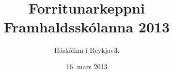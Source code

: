 \documentclass[11pt,a4paper,oneside]{article}
\title{Forritunarkeppni Framhaldsskólanna 2013}
\date{16. mars 2013}
\author{Háskólinn í Reykjavík}
\newcommand{\problemstatement}[1]{  }
\begin{document}
	\maketitle
	\thispagestyle{empty}
	\pagebreak
	\problemstatement{hallo_heimur}
	\problemstatement{namundun}
	\problemstatement{nidurteljari}
	\problemstatement{jolagjafir}
	\problemstatement{fjoldi_stafa}
	\problemstatement{tveirstrengir}
	\problemstatement{happy_birthday}
	\problemstatement{deiling}
	\problemstatement{deiling_while}
	\problemstatement{compression}
	\problemstatement{decompression}
	\problemstatement{gotumalning}
	\problemstatement{freq_analysis}
	\problemstatement{fullkomintala}
	\problemstatement{ex}
	\problemstatement{stigatafla}
	\problemstatement{logleg_nofn}
	\problemstatement{stysta_leid_skak}

	\problemstatement{veldi_af_2}
	\problemstatement{ofugur_texti}
	\problemstatement{kula_i_kassa}
	\problemstatement{lykilord}
	\problemstatement{kelvin_fahrenheit}
	\problemstatement{oradad}
	\problemstatement{lodrettur_texti}
	\problemstatement{fizzbuzz}
	\problemstatement{inniheldur_tolu}
	\problemstatement{dagatal}
	\problemstatement{slongu_texti}
	\problemstatement{hamming_distance}
	\problemstatement{hjolalas}
	\problemstatement{talnaspirall}
	\problemstatement{translate}
	\problemstatement{bmi}
	\problemstatement{stae_pusl}
	\problemstatement{samlagning}
\end{document}
